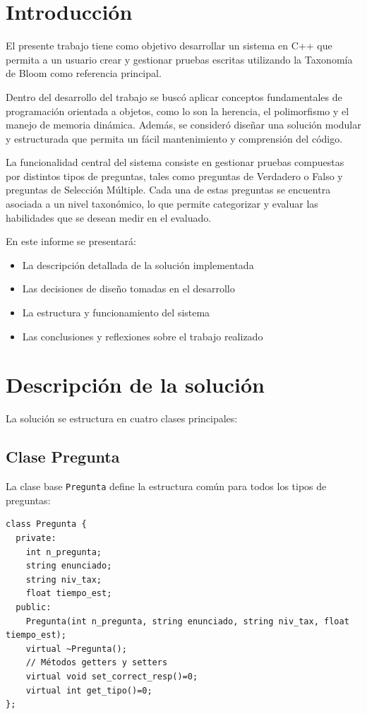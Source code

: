 \documentclass[12pt]{article}
\begin{document}
\section{Introducci\'on}
El presente trabajo tiene como objetivo desarrollar un sistema en C++ que permita a un usuario crear y gestionar pruebas escritas utilizando la Taxonom\'ia de Bloom como referencia principal.

Dentro del desarrollo del trabajo se busc\'o aplicar conceptos fundamentales de programaci\'on orientada a objetos, como lo son la herencia, el polimorfismo y el manejo de memoria din\'amica. Adem\'as, se consider\'o dise\~nar una soluci\'on modular y estructurada que permita un f\'acil mantenimiento y comprensi\'on del c\'odigo.

La funcionalidad central del sistema consiste en gestionar pruebas compuestas por distintos tipos de preguntas, tales como preguntas de Verdadero o Falso y preguntas de Selecci\'on M\'ultiple. Cada una de estas preguntas se encuentra asociada a un nivel taxon\'omico, lo que permite categorizar y evaluar las habilidades que se desean medir en el evaluado.

En este informe se presentar\'a:
\begin{itemize}
    \item La descripci\'on detallada de la soluci\'on implementada
    \item Las decisiones de dise\~no tomadas en el desarrollo
    \item La estructura y funcionamiento del sistema
    \item Las conclusiones y reflexiones sobre el trabajo realizado
\end{itemize}

\section{Descripci\'on de la soluci\'on}
La soluci\'on se estructura en cuatro clases principales:

\subsection{Clase Pregunta}
La clase base \texttt{Pregunta} define la estructura com\'un para todos los tipos de preguntas:

\begin{lstlisting}[style=customc]
class Pregunta {
  private:
    int n_pregunta;
    string enunciado;
    string niv_tax;
    float tiempo_est;
  public:
    Pregunta(int n_pregunta, string enunciado, string niv_tax, float tiempo_est);
    virtual ~Pregunta();
    // Métodos getters y setters
    virtual void set_correct_resp()=0;
    virtual int get_tipo()=0;
};
\end{lstlisting}
\end{document}
